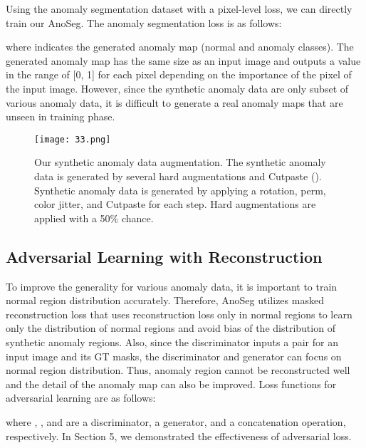 \documentclass{article} \usepackage{iclr2022_conference,times}
\begin{document}
Using the anomaly segmentation dataset with a pixel-level loss, we can directly train our AnoSeg. The anomaly segmentation loss  is as follows:

where  indicates the generated anomaly map (normal and anomaly classes). The generated anomaly map has the same size as an input image and outputs a value in the range of [0, 1] for each pixel depending on the importance of the pixel of the input image. However, since the synthetic anomaly data are only subset of various anomaly data, it is difficult to generate a real anomaly maps that are unseen in training phase.





\begin{figure}[t]
\begin{center}
\texttt{[image: 33.png]} 

\end{center}
\vspace{-0.2cm}
\caption{Our synthetic anomaly data augmentation. The synthetic anomaly data is generated by several hard augmentations and Cutpaste (\cite{cut}). Synthetic anomaly data is generated by applying a rotation, perm, color jitter, and Cutpaste for each step. Hard augmentations are applied with a 50\% chance.}
\vspace{-0.2cm}
\label{fig3}
\end{figure}
\subsection{Adversarial Learning with Reconstruction}
To improve the generality for various anomaly data, it is important to train normal region distribution accurately. Therefore, AnoSeg utilizes masked reconstruction loss that uses reconstruction loss only in normal regions to learn only the distribution of normal regions and avoid bias of the distribution of synthetic anomaly regions. Also, since the discriminator inputs a pair for an input image and its GT masks, the discriminator and generator can focus on normal region distribution. Thus, anomaly region cannot be reconstructed well and the detail of the anomaly map can also be improved. Loss functions for adversarial learning are as follows:


where , , and  are a discriminator, a generator, and a concatenation operation, respectively. In Section 5, we demonstrated the effectiveness of adversarial loss.
\end{document}
